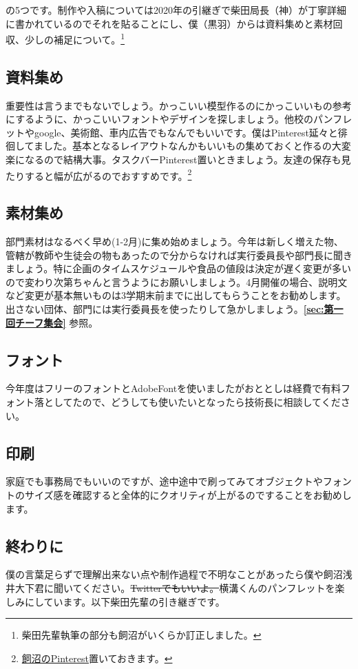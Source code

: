 \documentclass[dvipdfmx,jb5]{jarticle}
\begin{document}
の5つです。制作や入稿については2020年の引継ぎで柴田局長（神）が丁寧詳細に書かれているのでそれを貼ることにし、僕（黒羽）からは資料集めと素材回収、少しの補足について。\footnote{柴田先輩執筆の部分も飼沼がいくらか訂正しました。}

\subsection{資料集め}
重要性は言うまでもないでしょう。かっこいい模型作るのにかっこいいもの参考にするように、かっこいいフォントやデザインを探しましょう。他校のパンフレットやgoogle、美術館、車内広告でもなんでもいいです。僕はPinterest延々と徘徊してました。基本となるレイアウトなんかもいいもの集めておくと作るの大変楽になるので結構大事。タスクバーPinterest置いときましょう。友達の保存も見たりすると幅が広がるのでおすすめです。\footnote{\href{https://www.pinterest.jp/mpse_}{飼沼のPinterest}置いておきます。}

\subsection{素材集め}
部門素材はなるべく早め(1-2月)に集め始めましょう。今年は新しく増えた物、管轄が教師や生徒会の物もあったので分からなければ実行委員長や部門長に聞きましょう。特に企画のタイムスケジュールや食品の値段は決定が遅く変更が多いので変わり次第ちゃんと言うようにお願いしましょう。4月開催の場合、説明文など変更が基本無いものは3学期末前までに出してもらうことをお勧めします。出さない団体、部門には実行委員長を使ったりして急かしましょう。{\bf \ref{sec:第一回チーフ集会}} 参照。

\subsection{フォント}
今年度はフリーのフォントとAdobeFontを使いましたがおととしは経費で有料フォント落としてたので、どうしても使いたいとなったら技術長に相談してください。

\subsection{印刷}
家庭でも事務局でもいいのですが、途中途中で刷ってみてオブジェクトやフォントのサイズ感を確認すると全体的にクオリティが上がるのですることをお勧めします。

\subsection{終わりに}
僕の言葉足らずで理解出来ない点や制作過程で不明なことがあったら僕や飼沼浅井大下君に聞いてください。\sout{Twitterでもいいよ。}横溝くんのパンフレットを楽しみにしています。以下柴田先輩の引き継ぎです。
\end{document}

